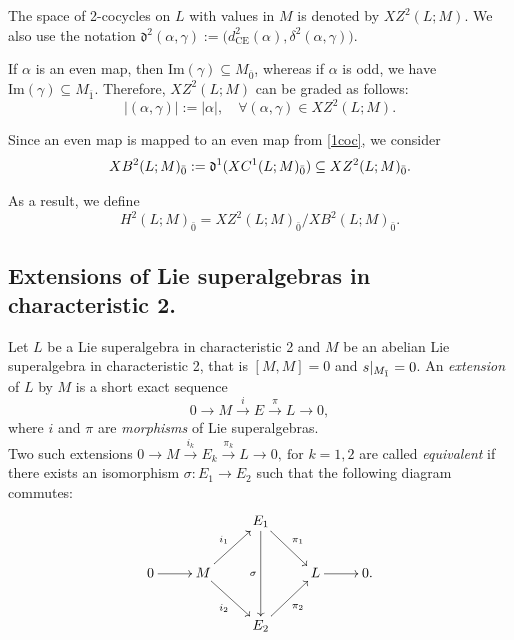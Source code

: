 \documentclass[12pt]{amsart}
\newcommand {\ce}{{\text{CE}}}
\newcommand{\black}{\color{black}}
\begin{document}
\vspace{0.2 mm}

The space of 2-cocycles on $L$ with values in $M$ is denoted by $XZ^2(L;M)$. We also use the notation $\mathfrak{d}^2(\alpha,\gamma):=\bigl(d_{\ce}^2(\alpha),\delta^2(\alpha,\gamma)\bigr)$. 

\vspace{0.5 em} 

If $\alpha$ is an even map, then $\mathrm{Im}(\gamma)\subseteq M_{\overline{0}}$, whereas if $\alpha$ is odd, we have $\mathrm{Im}(\gamma) \subseteq M_{\overline{1}}$. Therefore, $XZ^2(L;M)$ can be graded as follows:
\begin{equation}\label{cograd}|(\alpha,\gamma)|:=|\alpha|, \quad \forall (\alpha,\gamma)\in XZ^2(L;M).\end{equation}

\vspace{0.5em}

Since an even map is mapped to an even map from \eqref{1coc}, we consider
\[
    \begin{gathered}
        XB^2(L;M)_{{\bar0}}:=\mathfrak{d}^1(XC^1(L;M)_{{\bar0}})\subseteq XZ^2(L;M)_{{\bar0}}.
    \end{gathered}
\]
\vspace{0.5mm}

As a result, we define
\begin{equation}\label{evco} H^2(L;M)_{\bar 0}=XZ^2(L;M)_{\bar 0}/XB^2(L;M)_{\bar 0}.\end{equation}

\vspace{0.5 em}

\subsection{Extensions of Lie superalgebras in characteristic 2.}\label{ext} Let $L$ be a Lie superalgebra in characteristic 2  and $M$ be an  abelian Lie superalgebra in  characteristic 2, that is $[M,M]=0$ and $s|_{M_{{\bar1}}}=0$.  An \emph{extension} of $L$ by $M$ is a short exact sequence 
\begin{equation}\label{eq:extension}
0 \longrightarrow M \xrightarrow{i} E \xrightarrow{\pi} L \longrightarrow 0,
\end{equation}
where \black $i$ and $\pi$ are \emph{morphisms} of Lie superalgebras.\\

\noindent Two such extensions $0\to M\xrightarrow{i_k}E_k\xrightarrow{\pi_k}L\to0,~ \text{for } k=1,2$
are called \emph{equivalent} if there exists an isomorphism $\sigma:E_1\to E_2$ such that the following diagram commutes:
\begin{equation}\label{eq:diagram}
  \xymatrix{
     && E_1 \ar[dr]^{\pi_1} \ar[dd]_{\sigma} & \\
     0 \ar[r] & M \ar[ur]^{i_1} \ar[dr]_{i_2} && L \ar[r] & 0. \\
     && E_2 \ar[ur]_{\pi_2} 
  }
\end{equation}
\end{document}
